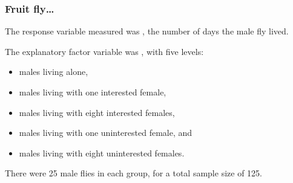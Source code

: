 \documentclass{beamer}\usepackage[]{graphicx}\usepackage[]{xcolor}
\begin{document}
\begin{frame}[fragile]
\frametitle{Fruit fly\ldots}

The response variable measured was , the number of days the male fly lived.
\bigskip
  

The explanatory factor variable was , with five levels:

\begin{itemize}
 \item  {} males living alone, \\
 \item  {} males living with one interested female, \\
 \item  {} males living with eight interested females,\\
 \item  {} males living with one uninterested female, and \\
 \item  {} males living with eight uninterested females.
\end{itemize}
\medskip

There were 25 male flies in each group, for a total sample size of 125.
\end{frame}
\end{document}
